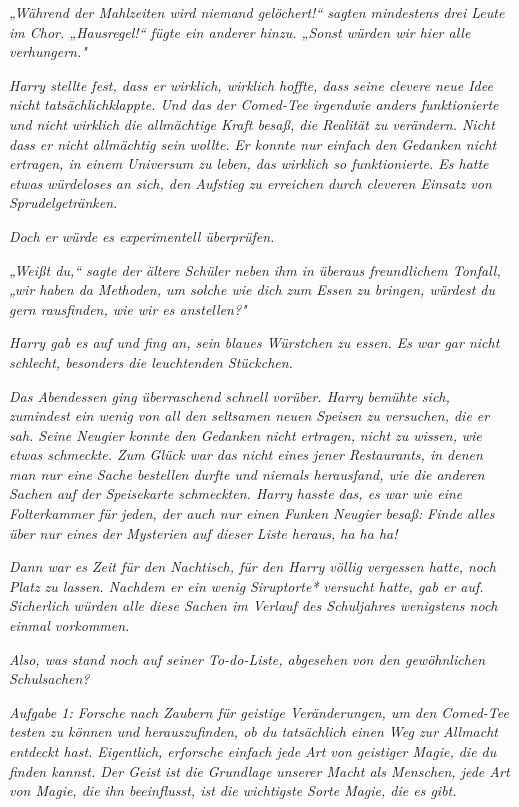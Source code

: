 {\emph{„Während der Mahlzeiten wird niemand gelöchert!“ sagten mindestens drei Leute im Chor. „Hausregel!“ fügte ein anderer hinzu. „Sonst würden wir hier alle verhungern."}

\emph{Harry stellte fest, dass er wirklich, wirklich hoffte, dass seine clevere neue Idee nicht} \emph{\emph{tatsächlich}klappte. Und das der Comed-Tee irgendwie anders funktionierte und nicht} \emph{\emph{wirklich}} \emph{die allmächtige Kraft besaß, die Realität zu verändern. Nicht dass er nicht allmächtig sein} \emph{\emph{wollte.}} \emph{Er konnte nur} \emph{einfach den Gedanken nicht ertragen, in einem Universum zu leben, das wirklich so funktionierte. Es hatte etwas} \emph{\emph{würdeloses}} \emph{an sich, den Aufstieg zu erreichen durch cleveren Einsatz von Sprudelgetränken.}

\emph{Doch er} \emph{\emph{würde}} \emph{es experimentell überprüfen.}

\emph{„Weißt du,“ sagte der ältere Schüler neben ihm in überaus freundlichem Tonfall, „wir haben da Methoden, um solche wie dich zum Essen zu bringen, würdest du gern rausfinden, wie wir es anstellen?"}

\emph{Harry gab es auf und fing an, sein blaues Würstchen zu essen. Es war gar nicht schlecht, besonders die leuchtenden Stückchen.}

\emph{Das Abendessen ging überraschend schnell vorüber. Harry} \emph{bemühte sich, zumindest ein wenig von all den seltsamen neuen Speisen zu versuchen, die er sah. Seine Neugier konnte den Gedanken nicht ertragen,} \emph{\emph{nicht zu wissen,}} \emph{wie etwas schmeckte. Zum Glück war das nicht eines jener Restaurants, in denen man nur eine Sache bestellen durfte und niemals herausfand, wie die anderen Sachen auf der Speisekarte schmeckten. Harry} \emph{\emph{hasste}} \emph{das, es war wie eine Folterkammer für} \emph{jeden, der auch nur einen Funken Neugier besaß:} \emph{\emph{Finde alles über nur eines der Mysterien auf dieser Liste heraus, ha ha ha!}}

\emph{Dann war es Zeit für den Nachtisch, für den Harry völlig vergessen hatte, noch Platz zu lassen. Nachdem er ein wenig} \emph{Siruptorte*} \emph{versucht hatte, gab er auf. Sicherlich würden alle diese Sachen im Verlauf des Schuljahres wenigstens noch einmal vorkommen.}

\emph{Also, was stand noch auf seiner To-do-Liste, abgesehen von den gewöhnlichen Schulsachen?}

\emph{\emph{Aufgabe 1: Forsche nach Zaubern für geistige Veränderungen, um den Comed-Tee testen zu können und herauszufinden, ob du tatsächlich einen Weg zur Allmacht entdeckt hast. Eigentlich, erforsche einfach jede Art von geistiger Magie, die du finden kannst. Der Geist ist die Grundlage unserer Macht als Menschen, jede Art von Magie, die ihn beeinflusst, ist die wichtigste Sorte Magie, die es gibt.}}

}

